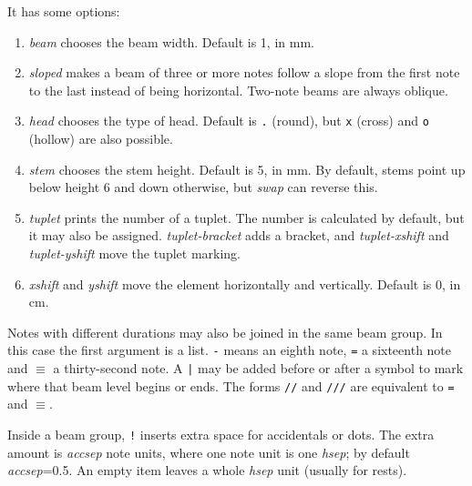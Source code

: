 \documentclass[final]{article}
\newcommand{\TTT}[2][0]{\Text[yshift=#1]{\texttt{\textbackslash #2}}}
\begin{document}
It has some options:
\begin{enumerate}[-]
\item \textsl{beam} chooses the beam width. Default is 1, in mm. 
\item \textsl{sloped} makes a beam of three or more notes follow a slope from the first note to the last instead of being horizontal.  Two-note beams are always oblique.
\item \textsl{head} chooses the type of head. Default is \texttt{.} (round), but \texttt{x} (cross) and \texttt{o} (hollow) are also possible.
\item \textsl{stem} chooses the stem height. Default is 5, in mm. By default, stems point up below height 6 and down otherwise, but \textsl{swap} can reverse this.
\item \textsl{tuplet} prints the number of a tuplet. The number is calculated by default, but it may also be assigned. \textsl{tuplet-bracket} adds a bracket, and \textsl{tuplet-xshift} and \textsl{tuplet-yshift} move the tuplet marking.
\item \textsl{xshift} and \textsl{yshift} move the element horizontally and vertically. Default is 0, in cm.
\end{enumerate}


\begin{center}
\begin{mousik}
\Clef

\Space[1.5]
\Space[1.5]
\Barline[t=|.]
\end{mousik}
\end{center}

Notes with different durations may also be joined in the same beam group. In this case the first argument is a list. \texttt{-} means an eighth note, \texttt{=} a sixteenth note and $\equiv$ a thirty-second note. A \texttt{|} may be added before or after a symbol to mark where that beam level begins or ends. The forms \texttt{//} and \texttt{///} are equivalent to \texttt{=} and $\equiv$. 

Inside a beam group, \texttt{!} inserts extra space for accidentals or dots. The extra amount is \textsl{accsep} note units, where one note unit is one \textsl{hsep}; by default \textsl{accsep}=0.5. An empty item leaves a whole \textsl{hsep} unit (usually for rests).
	\begin{center}
		\begin{mousik}
			\Clef
			
			\Space[2]
			\TTT{Note\{|$\equiv$,|=,|$\equiv$,$\equiv$|,-,$\equiv$|\}\{0,1,2,3,2,1\}}
			\Space[-2]
			
			\Barline[t=|.]
		\end{mousik}
	\end{center}
\end{document}
